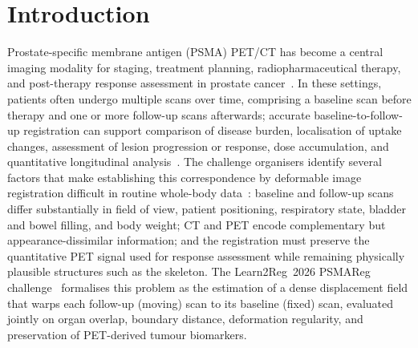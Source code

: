 \section{Introduction}

Prostate-specific membrane antigen (PSMA) PET/CT has become a central imaging modality for staging, treatment planning, radiopharmaceutical therapy, and post-therapy response assessment in prostate cancer~\cite{ref_psma_clinical}.
In these settings, patients often undergo multiple scans over time, comprising a baseline scan before therapy and one or more follow-up scans afterwards; accurate baseline-to-follow-up registration can support comparison of disease burden, localisation of uptake changes, assessment of lesion progression or response, dose accumulation, and quantitative longitudinal analysis~\cite{ref_psmareg_challenge}.
The challenge organisers identify several factors that make establishing this correspondence by deformable image registration difficult in routine whole-body data~\cite{ref_psmareg_challenge}: baseline and follow-up scans differ substantially in field of view, patient positioning, respiratory state, bladder and bowel filling, and body weight; CT and PET encode complementary but appearance-dissimilar information; and the registration must preserve the quantitative PET signal used for response assessment while remaining physically plausible structures such as the skeleton.
The Learn2Reg~2026 PSMAReg challenge~\cite{ref_learn2reg_alessa,ref_learn2reg_hansen,ref_psmaregdata} formalises this problem as the estimation of a dense displacement field that warps each follow-up (moving) scan to its baseline (fixed) scan, evaluated jointly on organ overlap, boundary distance, deformation regularity, and preservation of PET-derived tumour biomarkers.

